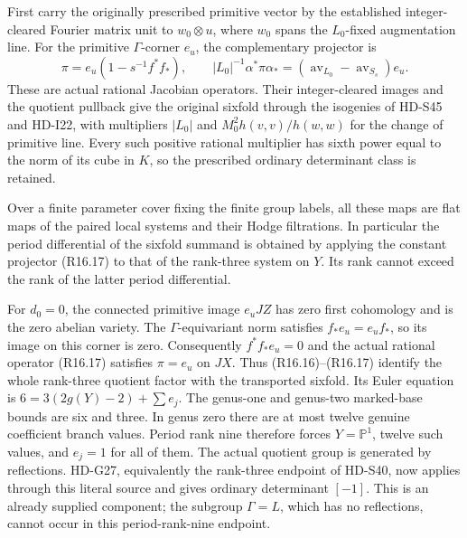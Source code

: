 First carry the originally prescribed primitive vector
by the established integer-cleared Fourier matrix unit
to \(w_0\otimes u\), where \(w_0\) spans the
\(L_0\)-fixed augmentation line. For the primitive
\(\Gamma\)-corner \(e_u\), the complementary projector is
\[
 \pi=e_u(1-s^{-1}f^*f_*),\qquad
 |L_0|^{-1}\alpha^*\pi\alpha_*
       =(\operatorname{av}_{L_0}-\operatorname{av}_{S_s})e_u.
                                                               \tag{R16.17}
\]
These are actual rational Jacobian operators. Their
integer-cleared images and the quotient pullback give
the original sixfold through the isogenies of HD-S45 and
HD-I22, with multipliers \(|L_0|\) and
\(M_0^2h(v,v)/h(w,w)\) for the change of primitive line.
Every such positive rational multiplier has sixth power
equal to the norm of its cube in \(K\), so the prescribed
ordinary determinant class is retained.

Over a finite parameter cover fixing the finite group
labels, all these maps are flat maps of the paired local
systems and their Hodge filtrations. In particular the
period differential of the sixfold summand is obtained
by applying the constant projector (R16.17) to that of
the rank-three system on \(Y\). Its rank cannot exceed
the rank of the latter period differential.

For \(d_0=0\), the connected primitive image
\(e_uJZ\) has zero first cohomology and is the zero
abelian variety. The \(\Gamma\)-equivariant norm satisfies
\(f_*e_u=e_uf_*\), so its image on this corner is zero.
Consequently \(f^*f_*e_u=0\) and the actual rational
operator (R16.17) satisfies \(\pi=e_u\) on \(JX\).
Thus (R16.16)--(R16.17) identify the whole rank-three
quotient factor with the transported sixfold.
Its Euler equation is \(6=3(2g(Y)-2)+\sum e_j\).
The genus-one and genus-two marked-base bounds are six
and three. In genus zero there are at most twelve genuine
coefficient branch values. Period rank nine therefore
forces \(Y=\mathbb P^1\), twelve such values, and
\(e_j=1\) for all of them. The actual quotient group
is generated by reflections. HD-G27, equivalently the
rank-three endpoint of HD-S40, now applies through this
literal source and gives ordinary determinant \([-1]\).
This is an already supplied component; the subgroup
\(\Gamma=L\), which has no reflections, cannot occur
in this period-rank-nine endpoint.

